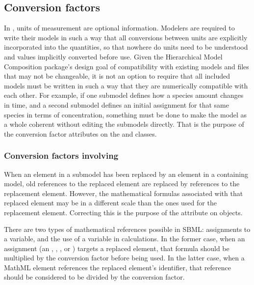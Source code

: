 \subsection{Conversion factors}
\label{conversion-factors}

In \sbmlthreecore, units of measurement are optional
information.  Modelers are required to write their models in such a way
that all conversions between units are explicitly incorporated into the
quantities, so that nowhere do units need to be understood and values
implicitly converted before use.  Given the Hierarchical Model
Composition package's design goal of compatibility with existing models
and files that may not be changeable, it is not an option to require
that all included models must be written in such a way that they are
numerically compatible with each other.  For example, if one submodel
defines how a species amount changes in time, and a second submodel
defines an initial assignment for that same species in terms of
concentration, something must be done to make the model as a whole
coherent without editing the submodels directly.  That is the purpose of
the conversion factor attributes on the \ReplacedElement and \Submodel
classes.


\subsubsection{Conversion factors involving }

When an element in a submodel has been replaced by an element in a
containing model, old references to the replaced element are replaced by
references to the replacement element.  However, the mathematical
formulas associated with that replaced element may be in a different
scale than the ones used for the replacement element.  Correcting this is the purpose
of the  attribute on \ReplacedElement objects.

There are two types of mathematical references possible in SBML:  assignments
to a variable, and the use of a variable in calculations.  In the former
case, when an assignment (an \InitialAssignment, \EventAssignment, \AssignmentRule,
or \RateRule) targets a replaced element, that formula should be 
multiplied by the conversion factor before being used.  In the latter
case, when a MathML  element references the replaced element's identifier, that
reference should be considered to be divided by the conversion factor.

